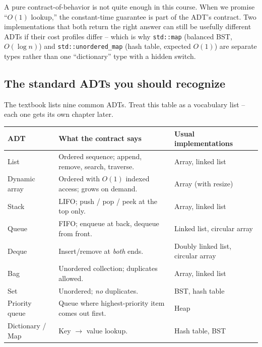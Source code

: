 \documentclass[11pt]{article}
\begin{document}
\begin{warnbox}
A pure contract-of-behavior is not quite enough in this course. When
we promise ``\(O(1)\) lookup,'' the constant-time guarantee is part
of the ADT's contract. Two implementations that both return the right
answer can still be usefully different ADTs if their cost profiles
differ -- which is why \texttt{std::map} (balanced BST, $O(\log n)$)
and \texttt{std::unordered\_map} (hash table, expected $O(1)$) are
separate types rather than one ``dictionary'' type with a hidden
switch.
\end{warnbox}

\subsection{The standard ADTs you should recognize}

The textbook lists nine common ADTs. Treat this table as a
vocabulary list -- each one gets its own chapter later.

\begin{center}
\footnotesize
\renewcommand{\arraystretch}{1.3}
\begin{tabular}{@{}p{2.7cm}p{6.1cm}p{4.2cm}@{}}
\hline
\textbf{ADT} & \textbf{What the contract says} & \textbf{Usual implementations} \\
\hline
List          & Ordered sequence; append, remove, search, traverse.      & Array, linked list \\
Dynamic array & Ordered with \(O(1)\) indexed access; grows on demand.   & Array (with resize) \\
Stack         & LIFO; push / pop / peek at the top only.                 & Array, linked list \\
Queue         & FIFO; enqueue at back, dequeue from front.               & Linked list, circular array \\
Deque         & Insert/remove at \emph{both} ends.                       & Doubly linked list, circular array \\
Bag           & Unordered collection; duplicates allowed.                & Array, linked list \\
Set           & Unordered; \emph{no} duplicates.                         & BST, hash table \\
Priority queue & Queue where highest-priority item comes out first.     & Heap \\
Dictionary / Map & Key \(\to\) value lookup.                             & Hash table, BST \\
\hline
\end{tabular}
\end{center}
\end{document}
